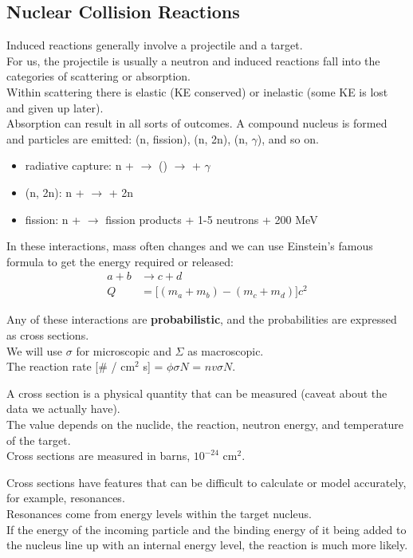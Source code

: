 \documentclass[12pt]{article}
\begin{document}
\subsection*{Nuclear Collision Reactions}
Induced reactions generally involve a projectile and a target. \\
For us, the projectile is usually a neutron and induced reactions fall into the categories of scattering or absorption.\\
Within scattering there is elastic (KE conserved) or inelastic (some KE is lost and given up later).\\
Absorption can result in all sorts of outcomes. 
A compound nucleus is formed and particles are emitted: (n, fission), (n, 2n), (n, $\gamma$), and so on.
%
\begin{itemize}
\item radiative capture: n +  $\rightarrow$ () $\rightarrow$  + $\gamma$
\item (n, 2n): n +  $\rightarrow$  + 2n
\item fission: n +  $\rightarrow$ fission products + 1-5 neutrons + 200 MeV
\end{itemize}

In these interactions, mass often changes and we can use Einstein's famous formula to get the energy required or released:
\begin{align*}
a + b &\rightarrow c + d\\
Q &= \bigl[ (m_a + m_b) - (m_c + m_d) \bigr]c^2
\end{align*}

Any of these interactions are \textbf{probabilistic}, and the probabilities are expressed as cross sections. \\
We will use $\sigma$ for microscopic and $\Sigma$ as macroscopic.\\
The reaction rate [\# / cm$^2$ s] = $\phi \sigma N$ = $nv \sigma N$.

A cross section is a physical quantity that can be measured (caveat about the data we actually have).\\
The value depends on the nuclide, the reaction, neutron energy, and temperature of the target. \\
Cross sections are measured in barns, $10^{-24}$ cm$^2$.

Cross sections have features that can be difficult to calculate or model accurately, for example, resonances.\\
Resonances come from energy levels within the target nucleus. \\
If the energy of the incoming particle and the binding energy of it being added to the nucleus line up with an internal energy level, the reaction is much more likely.\\
\end{document}

